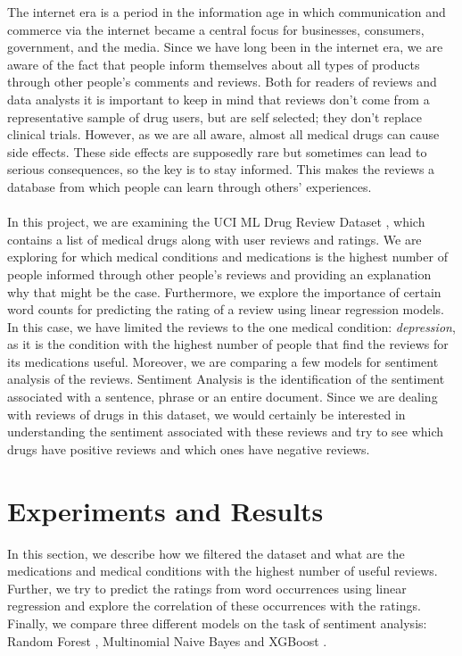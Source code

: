 \documentclass{article}
\begin{document}
The internet era is a period in the information age in which communication and commerce via the internet became a central focus for businesses, consumers, government, and the media. Since we have long been in the internet era, we are aware of the fact that people inform themselves about all types of products through other people's comments and reviews. Both for readers of reviews and data analysts it is important to keep in mind that reviews don't come from a representative sample of drug users, but are self selected; they don't replace clinical trials. However, as we are all aware, almost all medical drugs can cause side effects. These side effects are supposedly rare but sometimes can lead to serious consequences, so the key is to stay informed. This makes the reviews a database from which people can learn through others' experiences. \\
\\
In this project, we are examining the UCI ML Drug Review Dataset \citep{data}, which contains a list of medical drugs along with user reviews and ratings. We are exploring for which medical conditions and medications is the highest number of people informed through other people's reviews and providing an explanation why that might be the case. Furthermore, we explore the importance of certain word counts for predicting the rating of a review using linear regression models. In this case, we have limited the reviews to the one medical condition: \textit{depression}, as it is the condition with the highest number of people that find the reviews for its medications useful. Moreover, we are comparing a few models for sentiment analysis of the reviews. Sentiment Analysis is the identification of the sentiment associated with a sentence, phrase or an entire document. Since we are dealing with reviews of drugs in this dataset, we would certainly be interested in understanding the sentiment associated with these reviews and try to see which drugs have positive reviews and which ones have negative reviews.

\section{Experiments and Results}

In this section, we describe how we filtered the dataset and what are the medications and medical conditions with the highest number of useful reviews.  Further, we try to predict the ratings from word occurrences using linear regression and explore the correlation of these occurrences with the ratings. Finally, we compare three different models on the task of sentiment analysis:  Random Forest \citep{randomForest}, Multinomial Naive Bayes \citep{mnb} and XGBoost \citep{xgboost}.
\end{document}
